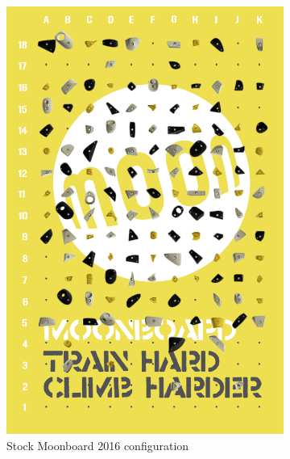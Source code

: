 \documentclass{article}
\begin{document}
\begin{figure}
\centering
\begin{subfigure}{.48\textwidth}
  \centering
  \includegraphics[width=.8\linewidth]{moonboard_stock}
  \caption{Stock Moonboard 2016 configuration}
  \label{fig: Stock Moonboard}
\end{subfigure}
\begin{subfigure}{.48\textwidth}
  \centering

\end{subfigure}
\end{figure}
\end{document}
